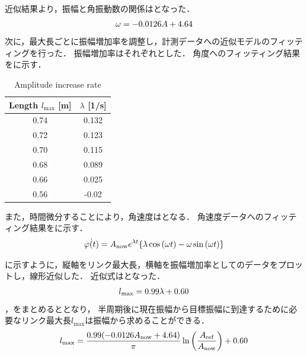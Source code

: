           近似結果より，振幅と角振動数の関係はとなった．
          \begin{eqnarray}
            \equlabel{A2ome}
            \omega=-0.0126A+4.64
          \end{eqnarray}
          次に，最大長ごとに振幅増加率を調整し，計測データへの近似モデルのフィッティングを行った．
          振幅増加率はそれぞれとした．
          角度へのフィッティング結果を\figref{}に示す．
          \begin{table}[tb]
            \begin{center}
              \caption{Amplitude increase rate}
              \vspace{2mm}
              \begin{tabular}{c|c}
                \hline
                Length $l_{\mathrm{max}}$ [m] & $\lambda$ [1/s] \\
                \hline
                0.74 &  0.132\\
                0.72 &  0.123\\
                0.70 &  0.115\\
                0.68 &  0.089\\
                0.66 &  0.025\\
                0.56 &  -0.02\\                       
                \hline
              \end{tabular}
            \end{center}
          \end{table}
          また，時間微分することにより，角速度はとなる．
          角速度データへのフィッティング結果を\figref{}に示す．
          \begin{eqnarray}
            \equlabel{Approximation Angular velocity}
            \dot{\varphi(t)}=A_{\mathrm{now}}e^{\lambda t}\{\lambda\cos{(\omega t)}-\omega\sin{(\omega t)}\}
          \end{eqnarray}
          
          \figref{}に示すように，縦軸をリンク最大長，横軸を振幅増加率としてのデータをプロットし，線形近似した．
          近似式はとなった．
          \begin{eqnarray}
            \equlabel{length relation}
            l_{\mathrm{max}}=0.99\lambda+0.60
          \end{eqnarray}
          ，をまとめるととなり，
          半周期後に現在振幅から目標振幅に到達するために必要なリンク最大長$l_{\mathrm{max}}$は振幅から求めることができる．
          \begin{eqnarray}
            \equlabel{l status}
            l_{\mathrm{max}}=\frac{0.99(-0.0126A_{\mathrm{now}}+4.64)}{\pi}\ln{\left(\frac{A_{\mathrm{ref}}}{A_{\mathrm{now}}}\right)}+0.60
          \end{eqnarray}
          
